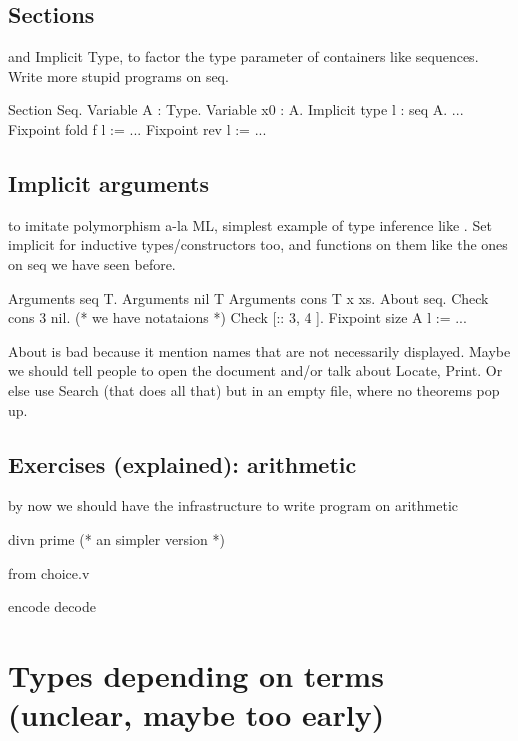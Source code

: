 \subsection{Sections}
and Implicit Type, to factor the type parameter of containers like
sequences.  Write more stupid programs on seq.

\begin{coq}{}
Section Seq.
Variable A : Type.
Variable x0 : A.
Implicit type l : seq A.
...
Fixpoint fold f l := ...
Fixpoint rev l := ...
\end{coq}


\subsection{Implicit arguments}
to imitate polymorphism a-la ML, simplest example of type inference
like .  Set implicit for inductive types/constructors too,
and functions on them like the ones on seq we have seen before.

\begin{coq}{}
Arguments seq {T}.
Arguments nil {T}
Arguments cons {T} x xs.
About seq.
Check cons 3 nil.
(* we have notataions *)
Check [:: 3, 4 ].
Fixpoint size A l := ...
\end{coq}

About is bad because it mention names that are not necessarily displayed.
Maybe we should tell people to open the document and/or talk about Locate,
Print.  Or else use Search (that does all that) but in an empty
file, where no theorems pop up.

\subsection{Exercises (explained): arithmetic}
by now we should have the infrastructure to write program on arithmetic

\begin{coq}{}
divn
prime  (* an simpler version *)
\end{coq}

from choice.v

\begin{coq}{}
encode
decode
\end{coq}

\section{Types depending on terms (unclear, maybe too early)}

